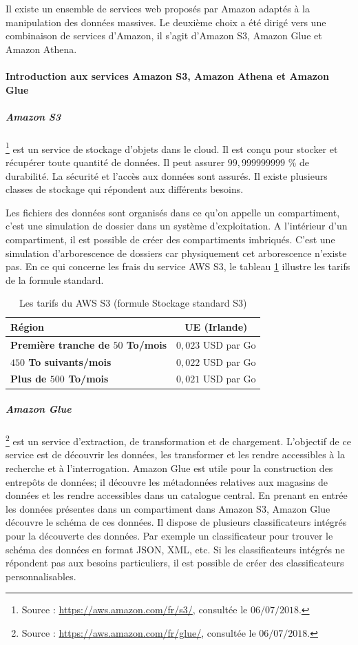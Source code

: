 Il existe un ensemble de services web proposés par Amazon  adaptés à la manipulation des données massives. Le deuxième choix a été dirigé vers une combinaison de services d'Amazon, il s'agit d'Amazon S3, Amazon Glue et Amazon Athena.

\paragraph{Introduction aux services Amazon S3, Amazon Athena et Amazon Glue }

\subparagraph{Amazon S3}
\footnote{Source : \url{https://aws.amazon.com/fr/s3/}, consultée le $06/07/2018$.} est un service de stockage d'objets dans le cloud. Il est conçu pour stocker et  récupérer toute quantité de données. Il peut assurer $ 99,999999999 $ \% de durabilité. La sécurité  et l'accès aux données sont assurés. Il existe plusieurs classes de stockage qui répondent aux différents besoins. 


Les fichiers des données sont organisés dans ce qu'on appelle un compartiment, c'est une simulation de dossier dans un système d'exploitation. A l'intérieur d'un compartiment, il est possible de créer des compartiments imbriqués. C'est une simulation d'arborescence de dossiers car physiquement cet arborescence n'existe pas. En ce qui concerne les frais du service AWS S3, le tableau   	\ref{tab:pricing-s3-standard} illustre les tarifs de la formule standard.
\begin{table}[H]
	\centering
	\captionsetup{justification=centering}
	\begin{tabular}{l c }
		\textbf{Région} & UE (Irlande) \\ \hline
		\textbf{Première tranche de $ 50 $ To/mois} &	$ 0,023 $ USD par Go\\ \hline
		\textbf{$ 450 $ To suivants/mois} &	$ 0,022 $ USD par Go \\ \hline
		\textbf{Plus de $ 500 $ To/mois} &	$ 0,021 $ USD par Go\\ \hline
	\end{tabular}
	\caption{Les tarifs du AWS S3 (formule Stockage standard S3)}
	\label{tab:pricing-s3-standard}
\end{table}

  
\subparagraph{Amazon  Glue} \label{aws:glue}
 \footnote{Source : \url{https://aws.amazon.com/fr/glue/}, consultée le $06/07/2018$.} est un service d'extraction, de transformation et de chargement. L'objectif de ce service est de découvrir les données, les transformer et les rendre accessibles à la recherche et à l'interrogation.  Amazon Glue  est utile pour la construction des entrepôts de données; il découvre les métadonnées relatives aux magasins de données et les rendre accessibles dans un catalogue central. En prenant en entrée les données  présentes dans un compartiment dans Amazon S3, Amazon Glue découvre le schéma de ces données. Il dispose de plusieurs classificateurs intégrés pour la découverte des données. Par exemple un classificateur pour trouver le schéma  des données en format JSON, XML, etc. Si les classificateurs intégrés ne répondent pas aux besoins particuliers, il est possible de créer des classificateurs personnalisables. 

